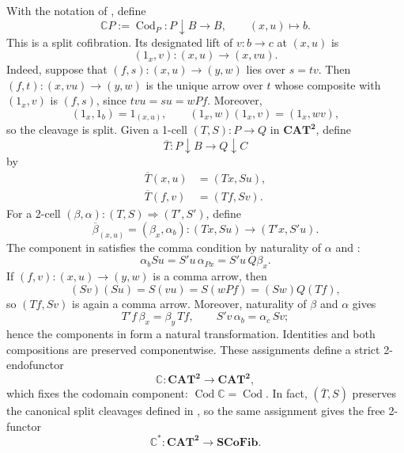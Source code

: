 \documentclass[11pt]{article}
\theoremstyle{plain}
\theoremstyle{definition}
\theoremstyle{remark}
\newcommand{\CAT}{\mathbf{CAT}}
\newcommand{\SCoFib}{\mathbf{SCoFib}}
\newcommand{\Cod}{\operatorname{Cod}}
\newcommand{\C}{\mathbb{C}}
\numberwithin{equation}{section}
\begin{document}
With the notation of , define
\begin{equation*}
\C P:=\Cod_{P}\colon
  P\!\downarrow\!B\longrightarrow B,
  \qquad (x,u)\longmapsto b.
\end{equation*}
This is a split cofibration.  Its designated lift of
$v\colon b\to c$ at $(x,u)$ is
\begin{equation}
(1_x,v)\colon(x,u)\longrightarrow(x,vu).
  \label{eq:free-cleavage}
\end{equation}
Indeed, suppose that $(f,s)\colon(x,u)\to(y,w)$ lies over $s=tv$.
Then $(f,t)\colon(x,vu)\to(y,w)$ is the unique arrow over $t$ whose
composite with $(1_x,v)$ is $(f,s)$, since $tvu=su=wPf$.
Moreover,
\begin{equation*}
  (1_x,1_b)=1_{(x,u)},
  \qquad
  (1_x,w)(1_x,v)=(1_x,wv),
\end{equation*}
so the cleavage is split.
Given a 1-cell $(T,S)\colon P\to Q$ in $\CAT^{\mathbf 2}$, define
\begin{equation*}
\overline T\colon P\!\downarrow\!B
  \longrightarrow Q\!\downarrow\!C
\end{equation*}
by
\begin{align*}
  \overline T(x,u)&=(Tx,Su),\\
  \overline T(f,v)&=(Tf,Sv).
\end{align*}
For a 2-cell
$(\beta,\alpha)\colon(T,S)\Rightarrow(T',S')$, define
\begin{equation}
\overline\beta_{(x,u)}=(\beta_x,\alpha_b)
  \colon(Tx,Su)\longrightarrow(T'x,S'u).
  \label{eq:bar-beta}
\end{equation}
The component in  satisfies the comma condition by
naturality of $\alpha$ and :
\begin{equation*}
\alpha_b Su=S'u\,\alpha_{Px}=S'u\,Q\beta_x.
\end{equation*}
If $(f,v)\colon(x,u)\to(y,w)$ is a comma arrow, then
\begin{equation*}
  (Sv)(Su)=S(vu)=S(wPf)=(Sw)Q(Tf),
\end{equation*}
so $(Tf,Sv)$ is again a comma arrow.  Moreover, naturality of
$\beta$ and $\alpha$ gives
\begin{equation*}
  T'f\,\beta_x=\beta_y\,Tf,
  \qquad
  S'v\,\alpha_b=\alpha_c\,Sv;
\end{equation*}
hence the components in  form a natural
transformation.  Identities and both compositions are preserved
componentwise.
These assignments define a strict 2-endofunctor
\begin{equation*}
\C\colon\CAT^{\mathbf 2}\longrightarrow\CAT^{\mathbf 2},
\end{equation*}
which fixes the codomain component: $\Cod\C=\Cod$.  In fact,
$(\overline T,S)$ preserves the canonical split cleavages defined in
, so the same assignment gives the free
2-functor
\begin{equation}
\C^{\!*}\colon\CAT^{\mathbf 2}\longrightarrow\SCoFib.
  \label{eq:free-2functor}
\end{equation}
\end{document}
